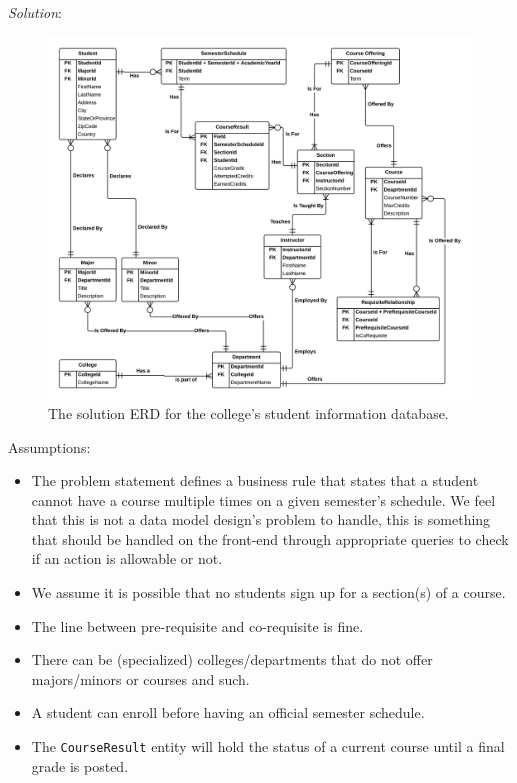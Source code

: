 \documentclass{article}
\begin{document}
\newpage
\textit{Solution}:\\

  \begin{figure}[h!]
    \centering
    \includegraphics[width=.95\linewidth]{HW08_Ex02_solution_ERD}
    \caption{The solution ERD for the college's student information database.}
    \label{fig:HW07_Ex02}
  \end{figure}
Assumptions:
\begin{itemize}
  \item The problem statement defines a business rule that states that a student cannot have a course multiple times on a given semester's schedule. We feel that this is not a data model design's problem to handle, this is something that should be handled on the front-end through appropriate queries to check if an action is allowable or not.
  \item We assume it is possible that no students sign up for a section(s) of a course.
  \item The line between pre-requisite and co-requisite is fine.
  \item There can be (specialized) colleges/departments that do not offer majors/minors or courses and such.
  \item A student can enroll before having an official semester schedule.
  \item The \texttt{CourseResult} entity will hold the status of a current course until a final grade is posted.
\end{itemize}
\end{document}
